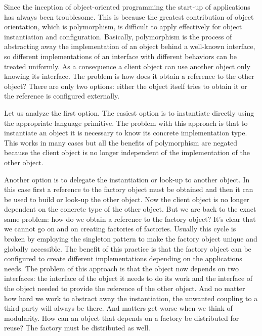 
Since the inception of object-oriented programming the start-up of applications has always been troublesome.
This is because the greatest contribution of object orientation, which is polymorphism, is difficult to
apply effectively for object instantiation and configuration. Basically, polymorphism is the process of 
abstracting away the implementation of an object behind a well-known interface, so different
implementations of an interface with different behaviors can be treated uniformly. As a consequence a client
object can use another object only knowing its interface. The problem is how does it obtain a reference to
the other object? There are only two options: either the object itself tries to obtain it or the reference is configured externally. 

Let us analyze the first option. The easiest option is to instantiate directly using the appropriate language primitive.
The problem with this approach is that to instantiate an object it is necessary to know its concrete implementation type.
This works in many cases but all the benefits of polymorphism are negated because the client object is no longer
independent of the implementation of the other object. 

Another option is to delegate the instantiation or look-up to another object. In this case first a reference to the factory object
must be obtained and then it can be used to build or look-up the other object. Now the client object is no longer dependent on the
concrete type of the other object. But we are back to the exact same problem: how do we obtain a reference to the factory object?
It's clear that we cannot go on and on creating factories of factories. Usually this cycle is broken by employing the singleton pattern
to make the factory object unique and globally accessible. The benefit of this practice is that the factory object can be configured
to create different implementations depending on the applications needs. The problem of this approach is that the object now depends
on two interfaces: the interface of the object it needs to do its work and the interface of the object needed to provide the reference
of the other object. And no matter how hard we work to abstract away the instantiation, the unwanted coupling to a third party will always
be there. And matters get worse when we think of modularity. How can an object that depends on a factory be distributed for reuse?
The factory must be distributed as well.

